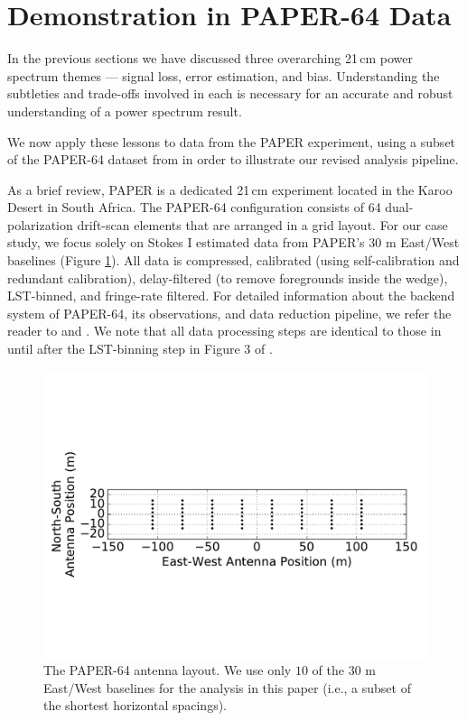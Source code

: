 \documentclass[preprint2,numberedappendix,tighten]{aastex6}  %
\begin{document}

\section{Demonstration in PAPER-64 Data}
\label{sec:CaseStudy}

In the previous sections we have discussed three overarching 21\,cm power spectrum themes --- signal loss, error estimation, 
and bias. Understanding the subtleties and trade-offs involved in each is necessary for an accurate and robust understanding of 
a power spectrum result. 

We now apply these lessons to data from the PAPER experiment, using a subset of the PAPER-64 dataset from
 in order to illustrate our revised analysis pipeline.

As a brief review, PAPER is a dedicated 21\,cm experiment located in the Karoo Desert in South Africa. The PAPER-64 
configuration consists of 64 dual-polarization drift-scan elements that are arranged in a grid layout. For our case study, we 
focus solely on Stokes I estimated data \citep{moore_et_al2013} from PAPER's $30$ m East/West baselines (Figure 
\ref{fig:ant_layout}). All data is compressed, calibrated (using self-calibration and redundant calibration), delay-filtered (to remove foregrounds inside the wedge), LST-binned, and fringe-rate filtered. For detailed information about the backend system of PAPER-64, its observations, and data reduction pipeline, we 
refer the reader to \citet{parsons_et_al2010} and . We note that all data processing steps are identical to those in  until after the LST-binning step in Figure 3 of .

\begin{figure}
	\centering
	\includegraphics[trim={0cm 3cm 0cm 3cm},width=\columnwidth]{plots/ant_layout_aspect.pdf}
	\caption{The PAPER-64 antenna layout. We use only $10$ of the $30$ m East/West baselines for the analysis in this 
paper (i.e., a subset of the shortest horizontal spacings).}
	\label{fig:ant_layout}
\end{figure}
\end{document}
